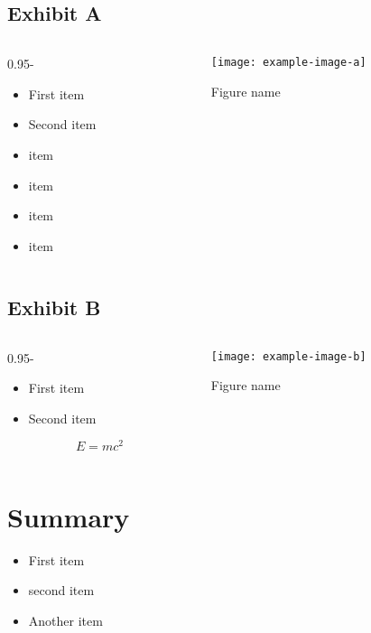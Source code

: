 \documentclass[final]{beamer}
\newcommand{\figfont}{\normalsize} %
\begin{document}
\begin{poster}
\subsection{Exhibit A}
\begin{columns}[c]
    \begin{column}{0.95\columnwidth-\figwidth}
        \begin{itemize}   \itemsep15pt    
            \item First item
            \item Second item
            \item item
            \item item
            \item item
            \item item
        \end{itemize}
        
    \end{column}
       
    \begin{column}{\figwidth}
        \centering
        \figfont
        \texttt{[image: example-image-a]}
        \vspace*{2ex}
        \caption{Figure name} 
    \end{column}
\end{columns}

\subsection{Exhibit B}
\begin{columns}[c]
	\begin{column}{0.95\columnwidth-\figwidth}
		\begin{itemize}   \itemsep15pt    
			\item First item
			\item Second item
		\end{itemize}
		
		$$
		E = mc^2
		$$
		
	\end{column}
	
	\begin{column}{\figwidth}
		\centering
		\figfont
		\texttt{[image: example-image-b]}
		\vspace*{2ex}
		\caption{Figure name} 
	\end{column}
\end{columns}



\lipsum[1-2]

\section{Summary} \justifying
\begin{itemize}
    \item First item
    \item second item
    \item Another item
\end{itemize}


\end{poster}
\end{document}
